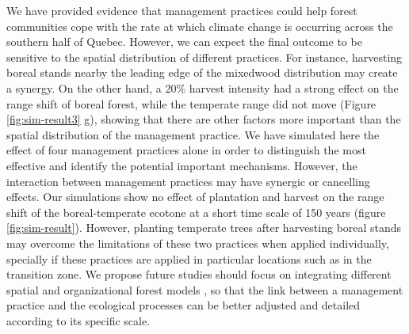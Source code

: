 We have provided evidence that management practices could help forest
communities cope with the rate at which climate change is occurring
across the southern half of Quebec. However, we can expect the final
outcome to be sensitive to the spatial distribution of different
practices. For instance, harvesting boreal stands nearby the leading
edge of the mixedwood distribution may create a synergy. On the other
hand, a 20\% harvest intensity had a strong effect on the range shift of
boreal forest, while the temperate range did not move (Figure
\ref{fig:sim-result3} g), showing that there are other factors more
important than the spatial distribution of the management practice. We
have simulated here the effect of four management practices alone in
order to distinguish the most effective and identify the potential
important mechanisms. However, the interaction between management
practices may have synergic or cancelling effects. Our simulations show
no effect of plantation and harvest on the range shift of the
boreal-temperate ecotone at a short time scale of 150 years (figure
\ref{fig:sim-result}). However, planting temperate trees after
harvesting boreal stands may overcome the limitations of these two
practices when applied individually, specially if these practices are
applied in particular locations such as in the transition zone. We
propose future studies should focus on integrating different spatial and
organizational forest models \citep[e.g.~][]{talluto2016}, so that the
link between a management practice and the ecological processes can be
better adjusted and detailed according to its specific scale.\\

\singlespacing
{\renewcommand{\bibname}{References}
\renewcommand{\bibsection}{\section{\bibname}}
}

